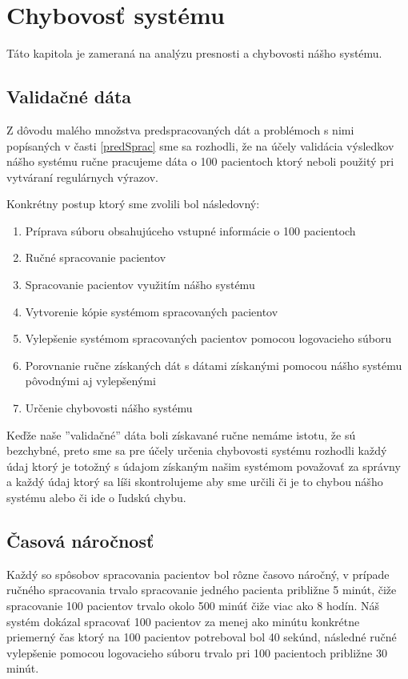 \chapter{Chybovosť systému}

Táto kapitola je zameraná na analýzu presnosti a chybovosti nášho systému.

\section{Validačné dáta}

Z dôvodu malého množstva predspracovaných dát a problémoch s nimi popísaných v časti \ref{predSprac} sme sa rozhodli, že na účely validácia výsledkov nášho systému ručne pracujeme dáta o 100 pacientoch ktorý neboli použitý pri vytváraní regulárnych výrazov.  

Konkrétny postup ktorý sme zvolili bol následovný:

\begin{enumerate}
	\item Príprava súboru obsahujúceho vstupné informácie o 100 pacientoch
	\item Ručné spracovanie pacientov
	\item Spracovanie pacientov využitím nášho systému
	\item Vytvorenie kópie systémom spracovaných pacientov
	\item Vylepšenie systémom spracovaných pacientov pomocou logovacieho súboru 
	\item Porovnanie ručne získaných dát s dátami získanými pomocou nášho systému pôvodnými aj vylepšenými
	\item Určenie chybovosti nášho systému   
\end{enumerate}

Keďže naše ''validačné'' dáta boli získavané ručne nemáme istotu, že sú bezchybné, preto sme sa pre účely určenia chybovosti systému rozhodli každý údaj ktorý je totožný s údajom získaným našim systémom považovať za správny a každý údaj ktorý sa líši skontrolujeme aby sme určili či je to chybou nášho systému alebo či ide o ľudskú chybu.

\section{Časová náročnosť}

Každý so spôsobov spracovania pacientov bol rôzne časovo náročný, v prípade ručného spracovania trvalo spracovanie jedného pacienta približne 5 minút, čiže spracovanie 100 pacientov trvalo okolo 500 minúť čiže viac ako 8 hodín. Náš systém dokázal spracovať 100 pacientov za menej ako minútu konkrétne priemerný čas ktorý na 100 pacientov potreboval bol 40 sekúnd, následné ručné vylepšenie pomocou logovacieho súboru trvalo pri 100 pacientoch približne 30 minút.

